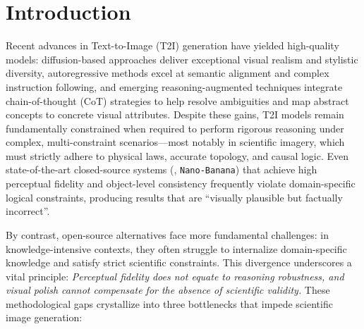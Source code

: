 \documentclass[runningheads]{llncs}
\begin{document}

\section{Introduction}
Recent advances in Text-to-Image (T2I) generation have yielded high-quality models: diffusion-based approaches \cite{yang2023improving,esser2024scaling,gao2024lumina,xie2025sana,qin2025lumina,ma2025efficient,ma2024neural} deliver exceptional visual realism and stylistic diversity, autoregressive methods \cite{sun2024autoregressive,zhang2024var,wang2024emu3,chen2025janus} excel at semantic alignment and complex instruction following, and emerging reasoning-augmented techniques integrate chain-of-thought (CoT) strategies \cite{liao2025imagegen,pan2025self} to help resolve ambiguities and map abstract concepts to concrete visual attributes. Despite these gains, T2I models remain fundamentally constrained when required to perform rigorous reasoning under complex, multi-constraint scenarios—most notably in scientific imagery, which must strictly adhere to physical laws, accurate topology, and causal logic. Even state-of-the-art closed-source systems (\eg, \texttt{Nano-Banana}) that achieve high perceptual fidelity and object-level consistency frequently violate domain-specific logical constraints, producing results that are ``visually plausible but factually incorrect''.

By contrast, open-source alternatives \cite{esser2024scaling,xie2024show,deng2025emerging,labs2025flux,wu2025qwen,cai2025hidream,ma2025janusflow} face more fundamental challenges: in knowledge-intensive contexts, they often struggle to internalize domain-specific knowledge and satisfy strict scientific constraints.
This divergence underscores a vital principle: \textit{Perceptual fidelity does not equate to reasoning robustness, and visual polish cannot compensate for the absence of scientific validity.}
These methodological gaps crystallize into three bottlenecks that impede scientific image generation:
\end{document}
